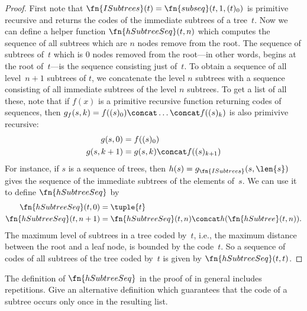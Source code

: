 \documentclass[../../../include/open-logic-section]{subfiles}
\begin{document}
\begin{proof}
  First note that $\fn{ISubtrees}(t) = \fn{subseq}(t, 1, (t)_0)$ is
  primitive recursive and returns the codes of the immediate subtrees
  of a tree~$t$. Now we can define a helper function
  $\fn{hSubtreeSeq}(t,n)$ which computes the sequence of all subtrees
  which are $n$ nodes remove from the root. The sequence of subtrees
  of~$t$ which is $0$ nodes removed from the root---in other words,
  begins at the root of~$t$---is the sequence consisting just
  of~$t$. To obtain a sequence of all level~$n+1$ subtrees of $t$, we
  concatenate the level $n$ subtrees with a sequence consisting of all
  immediate subtrees of the level $n$ subtrees. To get a list of all
  these, note that if $f(x)$ is a primitive recursive function
  returning codes of sequences, then $g_f(s, k) = f((s)_0) \concat
  \dots \concat f((s)_k)$ is also primivive recursive:
    \begin{align*}
      g(s, 0) & = f((s)_0)\\
      g(s, k+1) & = g(s, k) \concat f((s)_{k+1})
    \end{align*}
    For instance, if $s$ is a sequence of trees, then
    $h(s) = g_{\fn{ISubtrees}}(s, \len{s})$ gives the sequence of the
    immediate subtrees of the elements of~$s$. We can use it to define
    $\fn{hSubtreeSeq}$ by
    \begin{align*}
      \fn{hSubtreeSeq}(t, 0) & = \tuple{t} \\
      \fn{hSubtreeSeq}(t, n+1) & = \fn{hSubtreeSeq}(t, n) \concat
      h(\fn{hSubtree}(t, n)).
    \end{align*}
    The maximum level of subtrees in a tree coded by~$t$, i.e., the
    maximum distance between the root and a leaf node, is bounded by
    the code~$t$. So a sequence of codes of all subtrees of the tree
    coded by~$t$ is given by $\fn{hSubtreeSeq}(t, t)$.
\end{proof}

\begin{prob}
  The definition of $\fn{hSubtreeSeq}$ in the proof of
   in general includes
  repetitions. Give an alternative definition which guarantees that
  the code of a subtree occurs only once in the resulting list.
\end{prob}
\end{document}
